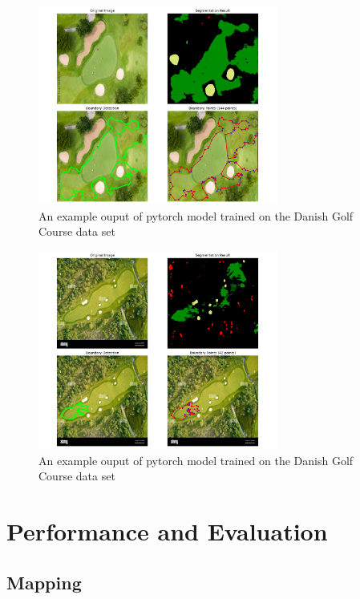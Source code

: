 \documentclass[final]{cmpreport_02}
\begin{document}
\begin{figure}[h!]
	\centering
	\includegraphics[width=0.7\textwidth]{./images/AdobeGolf_visualisation.png}
	\caption{An example ouput of pytorch model trained on the Danish Golf Course data set}
	\label{am:AGDanish}
\end{figure}

\begin{figure}[h!]
	\centering
	\includegraphics[width=0.7\textwidth]{./images/overheadGolfCourse_visualisation.png}
	\caption{An example ouput of pytorch model trained on the Danish Golf Course data set}
	\label{am:ohGCDanish}
\end{figure}

\section{Performance and Evaluation}
\subsection{Mapping}
\end{document}
